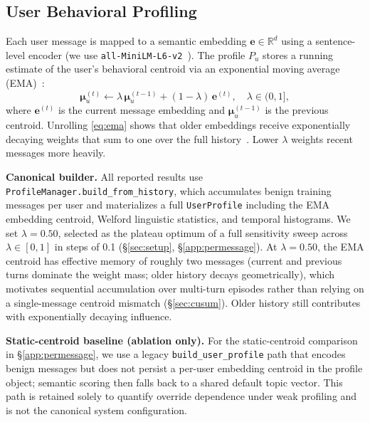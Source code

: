 \documentclass[conference]{IEEEtran}
\newcommand{\Pu}{P_u}
\newcommand{\ew}{\mathbf{e}}
\begin{document}
\subsection{User Behavioral Profiling}
\label{sec:profiling}

Each user message is mapped to a semantic embedding $\ew \in \mathbb{R}^d$ using a
sentence-level encoder (we use \texttt{all-MiniLM-L6-v2}~\cite{hf2024sentence}).
The profile $\Pu$ stores a running estimate of the user's behavioral centroid via an
exponential moving average (EMA)~\cite{hyndman2021fpp3}:
\begin{equation}
  \label{eq:ema}
  \boldsymbol{\mu}_u^{(t)} \leftarrow
    \lambda\,\boldsymbol{\mu}_u^{(t-1)} + (1-\lambda)\,\ew^{(t)},
  \quad \lambda \in (0,1],
\end{equation}
where $\ew^{(t)}$ is the current message embedding and $\boldsymbol{\mu}_u^{(t-1)}$
is the previous centroid.
Unrolling \eqref{eq:ema} shows that older embeddings receive exponentially decaying
weights that sum to one over the full history~\cite{hyndman2021fpp3}.
Lower $\lambda$ weights recent messages more heavily.

\textbf{Canonical builder.}
All reported results use \texttt{ProfileManager.build\_from\_history}, which
accumulates benign training messages per user and materializes a full
\texttt{UserProfile} including the EMA embedding centroid, Welford linguistic
statistics, and temporal histograms.
We set $\lambda = 0.50$, selected as the plateau optimum of a full sensitivity sweep
across $\lambda \in [0,1]$ in steps of 0.1 (\S\ref{sec:setup}, \S\ref{app:permessage}).
At $\lambda{=}0.50$, the EMA centroid has effective memory of roughly two messages
(current and previous turns dominate the weight mass; older history decays
geometrically), which motivates sequential accumulation over multi-turn episodes
rather than relying on a single-message centroid mismatch (\S\ref{sec:cusum}).
Older history still contributes with exponentially decaying influence.

\textbf{Static-centroid baseline (ablation only).}
For the static-centroid comparison in \S\ref{app:permessage}, we use a legacy
\texttt{build\_user\_profile} path that encodes benign messages but does not persist a
per-user embedding centroid in the profile object; semantic scoring then falls back to a
shared default topic vector.
This path is retained solely to quantify override dependence under weak profiling and
is not the canonical system configuration.
\end{document}
